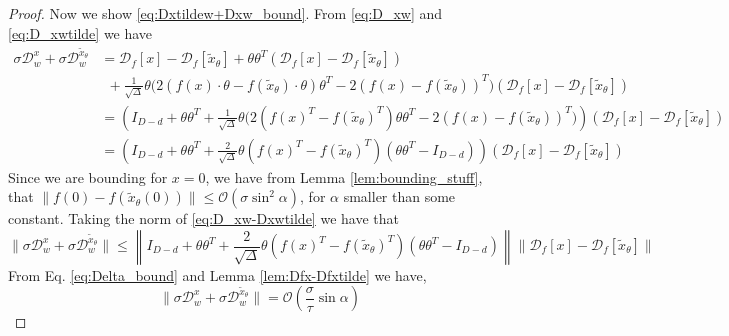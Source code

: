 \documentclass[12pt]{article}
\theoremstyle{remark}
\newcommand{\DD}{\mathcal{D}}
\newcommand{\OO}{\mathcal{O}}
\newcommand{\wtilde}[1]{\widetilde{#1}}
\begin{document}
\begin{appendices}
\begin{proof}
Now we show \eqref{eq:Dxtildew+Dxw_bound}. From \eqref{eq:D_xw} and \eqref{eq:D_xwtilde} we have 
\begin{equation}\label{eq:D_xw-Dxwtilde}
\begin{aligned}
    \sigma \DD^x_w + \sigma \DD^{\wtilde{x}_\theta}_ w 
    &= \DD_f[x] -\DD_f[\wtilde{x}_\theta] +\theta \theta^T (\DD_f[x] - \DD_f[\wtilde{x}_\theta]) \\
    &~~+\frac{1}{\sqrt{\Delta}} \theta 
    \bigg( 2 (f(x)\cdot \theta - f(\wtilde{x}_\theta) \cdot \theta)\theta^T - 2(f(x)- f(\wtilde{x}_\theta))^T\bigg) (\DD_f[x] - \DD_f[\wtilde{x}_\theta])\\
    &= \left(I_{D-d} +\theta \theta^T +\frac{1}{\sqrt{\Delta}} \theta 
    \bigg( 2 (f(x)^T - f(\wtilde{x}_\theta)^T)\theta\theta^T - 2(f(x)- f(\wtilde{x}_\theta))^T\bigg)\right) (\DD_f[x] - \DD_f[\wtilde{x}_\theta])\\
    &=\left(I_{D-d} +\theta \theta^T +\frac{2}{\sqrt{\Delta}} \theta 
      (f(x)^T - f(\wtilde{x}_\theta)^T) (\theta\theta^T - I_{D-d})\right) (\DD_f[x] - \DD_f[\wtilde{x}_\theta])
\end{aligned}
\end{equation}
Since we are bounding for $x= 0 $, we have from Lemma \ref{lem:bounding_stuff}, that $\|f(0) - f(\wtilde{x}_\theta(0))\| \leq \OO(\sigma \sin^2 \alpha)$, for $\alpha$ smaller than some constant.
Taking the norm of \eqref{eq:D_xw-Dxwtilde} we have that 
\[
\|\sigma \DD^x_w + \sigma \DD^{\wtilde{x}_\theta}_ w \| \leq \left\|I_{D-d} +\theta \theta^T +\frac{2}{\sqrt{\Delta}} \theta 
      (f(x)^T - f(\wtilde{x}_\theta)^T) (\theta\theta^T - I_{D-d})\right\| \|\DD_f[x] - \DD_f[\wtilde{x}_\theta]\|
\]
From Eq. \eqref{eq:Delta_bound} and Lemma \ref{lem:Dfx-Dfxtilde} we have,
\[
\|\sigma \DD^x_w + \sigma \DD^{\wtilde{x}_\theta}_ w \| =  \OO(\frac{\sigma}{\tau}\sin \alpha)
\]
\end{proof}



\end{appendices}
\end{document}
